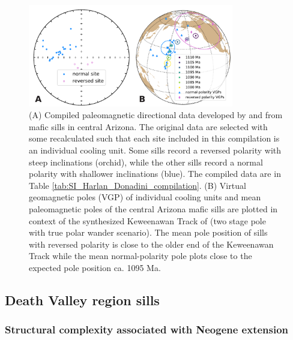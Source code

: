 \begin{figure}[h!]
\centering
\includegraphics[width=0.8\textwidth]{figure/Zhang2024b/Harlan_Donadini_compilation.pdf}
\caption[Compilation of paleomagnetic data from central Arizona mafic sills]{(A) Compiled paleomagnetic directional data developed by \cite{Harlan1993a} and \cite{Donadini2011a} from mafic sills in central Arizona. The original data are selected with some recalculated such that each site included in this compilation is an individual cooling unit. Some sills record a reversed polarity with steep inclinations (orchid), while the other sills record a normal polarity with shallower inclinations (blue). The compiled data are in Table \ref{tab:SI_Harlan_Donadini_compilation}. (B) Virtual geomagnetic poles (VGP) of individual cooling units and mean paleomagnetic poles of the central Arizona mafic sills are plotted in context of the synthesized Keweenawan Track of \cite{Swanson-Hysell2019a} (two stage pole with true polar wander scenario). The mean pole position of sills with reversed polarity is close to the older end of the Keweenawan Track while the mean normal-polarity pole plots close to the expected pole position ca. 1095 Ma.}
\label{fig:Harlan_Donadini_compilation}
\end{figure}

\subsection{Death Valley region sills}
\subsubsection{Structural complexity associated with Neogene extension}

